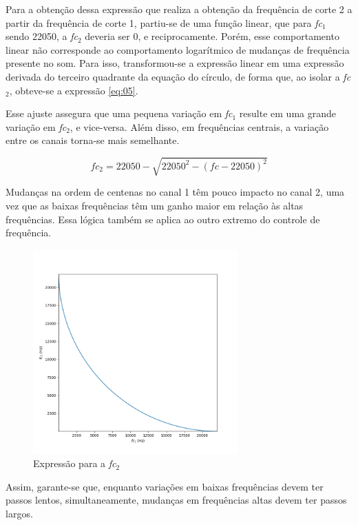 Para a obtenção dessa expressão que realiza a obtenção da frequência de corte 2 a partir da frequência de corte 1, partiu-se de uma função linear, que para \textit{fc$_{1}$} sendo 22050, a \textit{fc$_{2}$} deveria ser 0, e reciprocamente. Porém, esse comportamento linear não corresponde ao comportamento logarítmico de mudanças de frequência presente no som. Para isso, transformou-se a expressão linear em uma expressão derivada do terceiro quadrante da equação do círculo, de forma que, ao isolar a \textit{fc$_{2}$}, obteve-se a expressão \ref{eq:05}.

Esse ajuste assegura que uma pequena variação em \textit{fc$_{1}$} resulte em uma grande variação em \textit{fc$_{2}$}, e vice-versa. Além disso, em frequências centrais, a variação entre os canais torna-se mais semelhante.

\begin{equation}  \label{eq:05}
    fc_2 = 22050 - \sqrt{22050^2 - (fc - 22050)^2}
\end{equation}


Mudanças na ordem de centenas no canal 1 têm pouco impacto no canal 2, uma vez que as baixas frequências têm um ganho maior em relação às altas frequências. Essa lógica também se aplica ao outro extremo do controle de frequência. 

\begin{figure}[h]
    \centering
    \includegraphics[width=0.7\textwidth]{figuras/fig45.png}
    \caption{Expressão para a \textit{fc$_{2}$}}
    \label{fig45}
\end{figure}

Assim, garante-se que, enquanto variações em baixas frequências devem ter passos lentos, simultaneamente, mudanças em frequências altas devem ter passos largos. 


